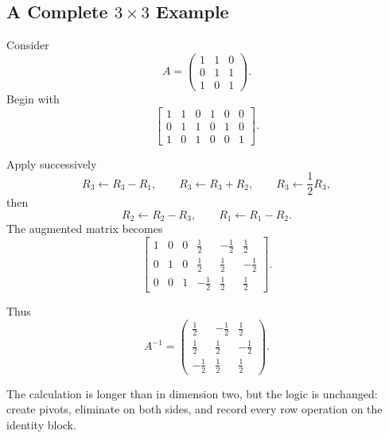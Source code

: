 \subsection{A Complete $3\times3$ Example}

Consider
\[
A=\begin{pmatrix}
1&1&0\\0&1&1\\1&0&1
\end{pmatrix}.
\]
Begin with
\[
\left[\begin{array}{ccc|ccc}
1&1&0&1&0&0\\
0&1&1&0&1&0\\
1&0&1&0&0&1
\end{array}\right].
\]

\begin{derivationbox}
Apply successively
\[
R_3\leftarrow R_3-R_1,
\qquad
R_3\leftarrow R_3+R_2,
\qquad
R_3\leftarrow \frac12R_3,
\]
then
\[
R_2\leftarrow R_2-R_3,
\qquad
R_1\leftarrow R_1-R_2.
\]
The augmented matrix becomes
\[
\left[\begin{array}{ccc|ccc}
1&0&0&\frac12&-\frac12&\frac12\\
0&1&0&\frac12&\frac12&-\frac12\\
0&0&1&-\frac12&\frac12&\frac12
\end{array}\right].
\]
\end{derivationbox}

Thus
\[
\boxed{A^{-1}=\begin{pmatrix}
\frac12&-\frac12&\frac12\\
\frac12&\frac12&-\frac12\\
-\frac12&\frac12&\frac12
\end{pmatrix}}.
\]

The calculation is longer than in dimension two, but the logic is unchanged: create pivots, eliminate on both sides, and record every row operation on the identity block.
